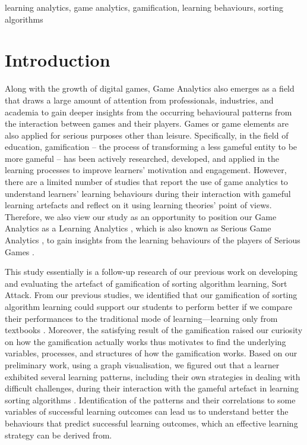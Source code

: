 \documentclass[conference]{IEEEtran}
\begin{document}
\begin{IEEEkeywords}
learning analytics, game analytics, gamification, learning behaviours, sorting algorithms
\end{IEEEkeywords}

\section{Introduction}
\label{sec:introduction}

Along with the growth of digital games, Game Analytics \cite{SeifEl-Nasr2013} also emerges as a field that draws a large amount of attention from professionals, industries, and academia to gain deeper insights from the occurring behavioural patterns from the interaction between games and their players. Games or game elements are also applied for serious purposes other than leisure. Specifically, in the field of education, gamification – the process of transforming a less gameful entity to be more gameful \cite{yohannis2014gamification,werbach2014gamification} – has been actively researched, developed, and applied in the learning processes to improve learners’ motivation and engagement. However, there are a limited number of studies that report the use of game analytics to understand learners’ learning behaviours during their interaction with gameful learning artefacts and reflect on it using learning theories’ point of views. Therefore, we also view our study as an opportunity to position our Game Analytics as a Learning Analytics \cite{Larusson2014}, which is also known as Serious Game Analytics \cite{Loh2015}, to gain insights from the learning behaviours of the players of Serious Games \cite{michael2005serious}.  

This study essentially is a follow-up research of our previous work on developing and evaluating the artefact of gamification of sorting algorithm learning, Sort Attack. From our previous studies, we identified that our gamification of sorting algorithm learning could support our students to perform better if we compare their performances to the traditional mode of learning—learning only from textbooks \cite{yohannis2015sort}. Moreover, the satisfying result of the gamification raised our curiosity on how the gamification actually works thus motivates to find the underlying variables, processes, and structures of how the gamification works. Based on our preliminary work, using a graph visualisation, we figured out that a learner exhibited several learning patterns, including their own strategies in dealing with difficult challenges, during their interaction with the gameful artefact in learning sorting algorithms \cite{yohannis2015visualization}. Identification of the patterns and their correlations to some variables of successful learning outcomes can lead us to understand better the behaviours that predict successful learning outcomes, which an effective learning strategy can be derived from.
\end{document}
